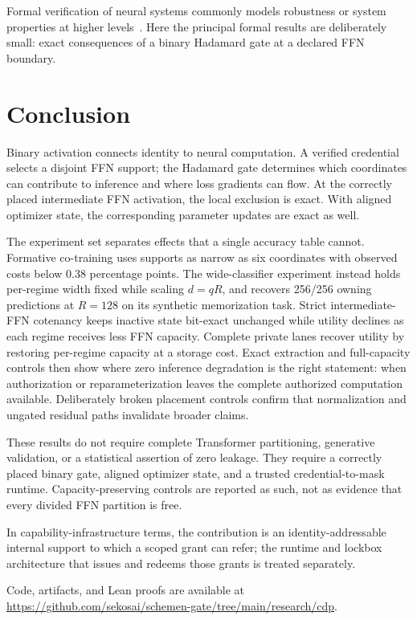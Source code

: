 \documentclass[11pt]{article}
\begin{document}
Formal verification of neural systems commonly models robustness or system
properties at higher levels~\citep{seshia2018formal}. Here the principal formal
results are deliberately small: exact consequences of a binary Hadamard gate at
a declared FFN boundary.

\section{Conclusion}

Binary activation connects identity to neural computation. A verified
credential selects a disjoint FFN support; the Hadamard gate determines which
coordinates can contribute to inference and where loss gradients can flow. At
the correctly placed intermediate FFN activation, the local exclusion is exact.
With aligned optimizer state, the corresponding parameter updates are exact as
well.

The experiment set separates effects that a single accuracy table cannot.
Formative co-training uses supports as narrow as six coordinates with observed
costs below 0.38 percentage points. The wide-classifier experiment instead
holds per-regime width fixed while scaling $d=qR$, and recovers 256/256 owning
predictions at $R=128$ on its synthetic memorization task. Strict
intermediate-FFN cotenancy keeps
inactive state bit-exact unchanged while utility declines as each regime
receives less FFN capacity. Complete private lanes recover utility by restoring
per-regime capacity at a storage cost. Exact extraction and full-capacity
controls then show where zero inference degradation is the right statement:
when authorization or reparameterization leaves the complete authorized
computation available. Deliberately broken placement controls confirm that
normalization and ungated residual paths invalidate broader claims.

These results do not require complete Transformer partitioning, generative
validation, or a statistical assertion of zero leakage. They require a
correctly placed binary gate, aligned optimizer state, and a trusted
credential-to-mask runtime. Capacity-preserving controls are reported as such,
not as evidence that every divided FFN partition is free.

In capability-infrastructure terms, the contribution is an identity-addressable
internal support to which a scoped grant can refer; the runtime and lockbox
architecture that issues and redeems those grants is treated separately.

Code, artifacts, and Lean proofs are available at
\url{https://github.com/sekosai/schemen-gate/tree/main/research/cdp}.
\end{document}
